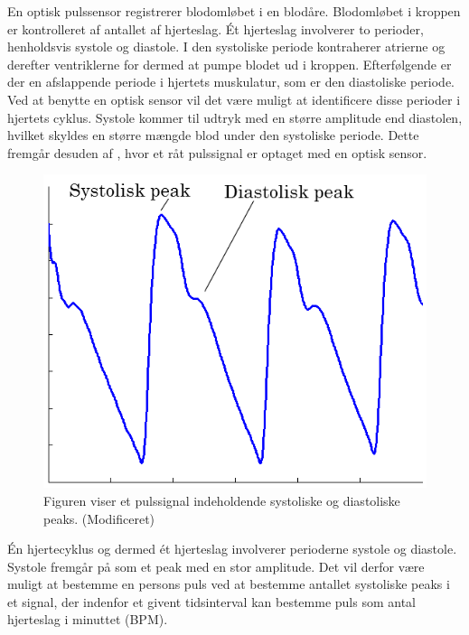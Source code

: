 En optisk pulssensor registrerer blodomløbet i en blodåre. Blodomløbet i kroppen er kontrolleret af antallet af hjerteslag. Ét hjerteslag involverer to perioder, henholdsvis systole og diastole. I den systoliske periode kontraherer atrierne og derefter ventriklerne for dermed at pumpe blodet ud i kroppen. Efterfølgende er der en afslappende periode i hjertets muskulatur, som er den diastoliske periode. \newline
Ved at benytte en optisk sensor vil det være muligt at identificere disse perioder i hjertets cyklus. Systole kommer til udtryk med en større amplitude end diastolen, hvilket skyldes en større mængde blod under den systoliske periode. Dette fremgår desuden af , hvor et råt pulssignal er optaget med en optisk sensor. \citep{Martini2012}
\begin{figure}[H]
	\centering
	\includegraphics[scale=0.3]{figures/cDesign/puls_goldenstand.png}
	\caption{Figuren viser et pulssignal indeholdende systoliske og diastoliske peaks. \citep{GanZahedi2011} (Modificeret)}
	\label{fig:puls_goldenstand}
\end{figure}\vspace{-0.25cm}
Én hjertecyklus og dermed ét hjerteslag involverer perioderne systole og diastole. Systole fremgår på  som et peak med en stor amplitude. Det vil derfor være muligt at bestemme en persons puls ved at bestemme antallet systoliske peaks i et signal, der indenfor et givent tidsinterval kan bestemme puls som antal hjerteslag i minuttet (BPM).